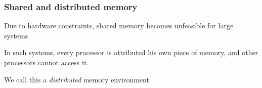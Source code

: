 \documentclass[aspectratio=43,9pt]{beamer}
\begin{document}
\begin{frame}
	\frametitle{Shared and distributed memory}
	\begin{myitemize}{2ex}
		\item Due to hardware constraints, shared memory becomes unfeasible for large systems
		\item In such systems, every processor is attributed his own piece of memory, and other processors cannot access it.
			\begin{center}
			\end{center}
		\item We call this a \emph{distributed} memory environment
	\end{myitemize}
\end{frame}
%
%
\end{document}
